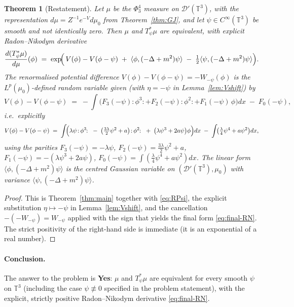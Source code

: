 \documentclass[12pt]{article}
\newtheorem{theorem}{Theorem}
\theoremstyle{definition}
\begin{document}
\begin{theorem}[Restatement]\label{thm:final}
Let $\mu$ be the $\Phi^4_3$ measure on $\mathcal{D}'(\mathbb{T}^3)$, with the
representation $d\mu=Z^{-1}e^{-V}d\mu_0$ from Theorem~\ref{thm:GJ}, and let
$\psi\in C^\infty(\mathbb{T}^3)$ be smooth and not identically zero. Then $\mu$ and
$T_\psi^*\mu$ are equivalent, with explicit Radon--Nikodym derivative
\begin{equation}\label{eq:final-RN}
\frac{d(T_\psi^*\mu)}{d\mu}(\phi)
\;=\; \exp\!\Bigl(\,V(\phi)-V(\phi-\psi)
\;+\; \langle\phi,(-\Delta+m^2)\psi\rangle
\;-\; \tfrac12\langle\psi,(-\Delta+m^2)\psi\rangle\Bigr).
\end{equation}
The renormalised potential difference $V(\phi)-V(\phi-\psi)=-W_{-\psi}(\phi)$ is the
$L^p(\mu_0)$-defined random variable given (with $\eta=-\psi$ in
Lemma~\ref{lem:Vshift}) by
\[
V(\phi)-V(\phi-\psi)
\;=\; -\int\!\bigl(F_3(-\psi)\colon\!\phi^3\!\colon
+ F_2(-\psi)\colon\!\phi^2\!\colon
+ F_1(-\psi)\,\phi\bigr)dx
\;-\; F_0(-\psi),
\]
i.e.\ explicitly
\[
V(\phi)-V(\phi-\psi)
\;=\; \int\!\Bigl(\lambda\psi\colon\!\phi^3\!\colon
\;-\; \bigl(\tfrac{3\lambda}{2}\psi^2+a\bigr)\colon\!\phi^2\!\colon
\;+\; \bigl(\lambda\psi^3+2a\psi\bigr)\phi\Bigr)dx
\;-\; \int\!\bigl(\tfrac{\lambda}{4}\psi^4 + a\psi^2\bigr)dx,
\]
using the parities $F_3(-\psi)=-\lambda\psi$, $F_2(-\psi)=\tfrac{3\lambda}{2}\psi^2+a$,
$F_1(-\psi)=-(\lambda\psi^3+2a\psi)$, $F_0(-\psi)=\int(\tfrac{\lambda}{4}\psi^4+a\psi^2)dx$.
The linear form $\langle\phi,(-\Delta+m^2)\psi\rangle$ is the centred Gaussian variable on
$(\mathcal{D}'(\mathbb{T}^3),\mu_0)$ with variance
$\langle\psi,(-\Delta+m^2)\psi\rangle$.
\end{theorem}

\begin{proof}
This is Theorem~\ref{thm:main} together with \eqref{eq:RPsi}, the explicit substitution
$\eta\mapsto-\psi$ in Lemma~\ref{lem:Vshift}, and the cancellation $-(-W_{-\psi})=W_{-\psi}$
applied with the sign that yields the final form \eqref{eq:final-RN}. The strict positivity
of the right-hand side is immediate (it is an exponential of a real number).
\end{proof}

\paragraph{Conclusion.}
The answer to the problem is \textbf{Yes}: $\mu$ and $T_\psi^*\mu$ are equivalent for
every smooth $\psi$ on $\mathbb{T}^3$ (including the case $\psi\not\equiv 0$ specified in
the problem statement), with the explicit, strictly positive Radon--Nikodym derivative
\eqref{eq:final-RN}.
\end{document}
